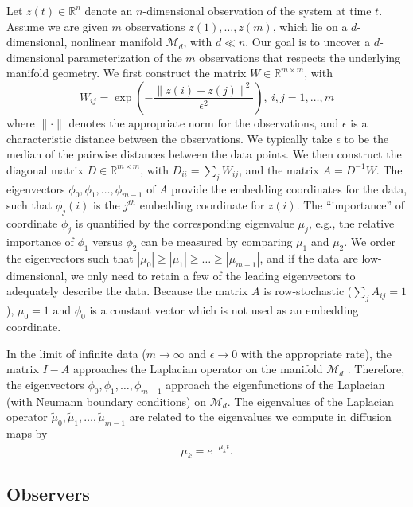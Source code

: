 \documentclass[preprint]{elsarticle}
\begin{document}
Let $z(t) \in \mathbb{R}^n$ denote an $n$-dimensional observation of the system at time $t$. 
%
Assume we are given $m$ observations $z(1), \dots, z(m)$, which lie on a $d$-dimensional, nonlinear manifold $\mathcal{M}_d$, with $d \ll n$. 
%
Our goal is to uncover a $d$-dimensional parameterization of the $m$ observations that respects the underlying manifold geometry.
%
We first construct the matrix $W \in \mathbb{R}^{m \times m}$, with
\begin{equation} \label{eq:W}
W_{ij} = \exp \left( -\frac{\|z(i) - z(j) \|^2}{\epsilon^2} \right), \ i,j=1,\ldots,m
\end{equation}
where $\| \cdot \|$ denotes the appropriate norm for the observations, and $\epsilon$ is a characteristic distance between the observations. 
%
We typically take $\epsilon$ to be the median of the pairwise distances between the data points.
%
We then construct the diagonal matrix $D \in \mathbb{R}^{m \times m}$, with $D_{ii} = \sum_j W_{ij}$, and the matrix $A  = D^{-1} W.$
%
The eigenvectors $\phi_0, \phi_1, \dots, \phi_{m-1}$ of $A$ provide the embedding coordinates for the data, such that
$\phi_{j}(i)$ is the $j^{th}$ embedding coordinate for $z(i)$.
%
The ``importance'' of coordinate $\phi_j$ is quantified by the corresponding eigenvalue $\mu_j$, e.g., the relative importance of $\phi_1$ versus $\phi_2$ can be measured by comparing $\mu_1$ and $\mu_2$.
%
We order the eigenvectors such that $|\mu_0| \ge |\mu_1| \ge \dots \ge |\mu_{m-1}|$, and if the data are low-dimensional, we only need to retain a few of the leading eigenvectors to adequately describe the data.
%
Because the matrix $A$ is row-stochastic ($\sum_j A_{ij} = 1$),  $\mu_0 = 1$ and $\phi_0$ is a constant vector which is not used as an embedding coordinate.

In the limit of infinite data ($m \rightarrow \infty$ and $\epsilon \rightarrow 0$ with the appropriate rate), the matrix $I-A$ approaches the Laplacian operator on the manifold $\mathcal{M}_d$ \cite{...}. 
%
Therefore, the eigenvectors $\phi_0, \phi_1, \dots, \phi_{m-1}$ approach the eigenfunctions of the Laplacian (with Neumann boundary conditions) on $\mathcal{M}_d$.
%
The eigenvalues of the Laplacian operator $\tilde{\mu}_0, \tilde{\mu}_1, \dots, \tilde{\mu}_{m-1}$ are related to the eigenvalues we compute in diffusion maps by 
\begin{equation}
\mu_k = e^{-\tilde{\mu}_k t}.
\end{equation}

\subsection{Observers}
\end{document}
